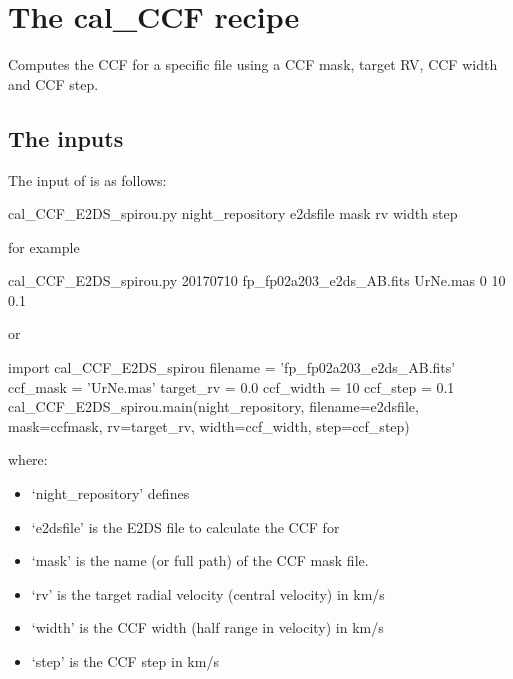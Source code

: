 \clearpage
\newpage
\section{The cal\_CCF recipe}
\label{ch:the_recipes:cal_CCF_E2DS_spirou}

Computes the CCF for a specific file using a CCF mask, target RV, CCF width and CCF step.

\subsection{The inputs}
The input of \calCCF is as follows:
\begin{cmdbox}
cal_CCF_E2DS_spirou.py night_repository e2dsfile mask rv width step
\end{cmdbox}
\noindent for example
\begin{cmdbox}[title={example}]
cal_CCF_E2DS_spirou.py 20170710 fp_fp02a203_e2ds_AB.fits UrNe.mas 0 10 0.1
\end{cmdbox}
\noindent or
\begin{pythonbox}
import cal_CCF_E2DS_spirou
filename = 'fp_fp02a203_e2ds_AB.fits'
ccf_mask = 'UrNe.mas'
target_rv = 0.0
ccf_width = 10
ccf_step = 0.1
cal_CCF_E2DS_spirou.main(night_repository, filename=e2dsfile, mask=ccfmask, 
                         rv=target_rv, width=ccf_width, step=ccf_step)
\end{pythonbox}

\noindent where:
\begin{itemize}
\item `night\_repository' defines \argnightname
\item `e2dsfile' is the E2DS file to calculate the CCF for
\item `mask' is the name (or full path) of the CCF mask file.


\item `rv' is the target radial velocity (central velocity) in km/s
\item `width' is the CCF width (half range in velocity) in km/s
\item `step' is the CCF step in km/s
\end{itemize}

